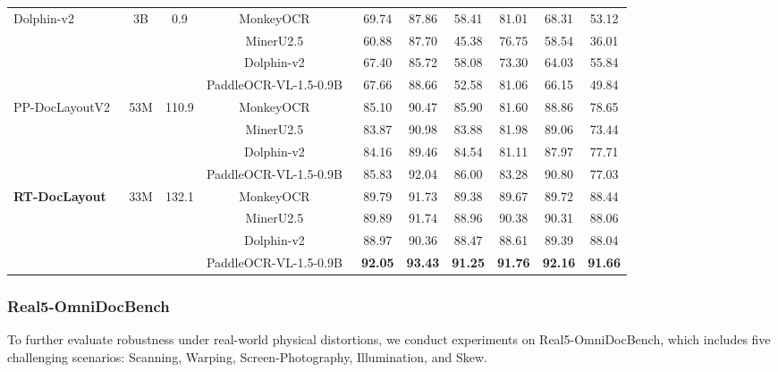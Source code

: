 \documentclass[11pt, a4paper,logo,  copyright, nonumbering]{paddleocr}
\begin{document}
\begin{table}[t]
{\begin{tabular}{l|c|c|c|c|c c c c c}
\midrule
\multirow{4}{*}{Dolphin-v2~\cite{feng2026dolphinv2universaldocumentparsing}}
& \multirow{4}{*}{3B}
& \multirow{4}{*}{0.9}
& MonkeyOCR~\cite{li2026monkeyocrdocumentparsingstructurerecognitionrelation} & 69.74 & 87.86 & 58.41 & 81.01 & 68.31 & 53.12 \\
& & & MinerU2.5~\cite{niu2025mineru25decoupledvisionlanguagemodel} & 60.88 & 87.70 & 45.38 & 76.75 & 58.54 & 36.01 \\
& & & Dolphin-v2~\cite{feng2026dolphinv2universaldocumentparsing} & 67.40 & 85.72 & 58.08 & 73.30 & 64.03 & 55.84 \\
& & & PaddleOCR-VL-1.5-0.9B~\cite{cui2026paddleocrvl15multitask09bvlm} & 67.66 & 88.66 & 52.58 & 81.06 & 66.15 & 49.84 \\
\midrule
\multirow{4}{*}{PP-DocLayoutV2~\cite{cui2025paddleocrvlboostingmultilingualdocument}}
& \multirow{4}{*}{53M}
& \multirow{4}{*}{110.9}
& MonkeyOCR~\cite{li2026monkeyocrdocumentparsingstructurerecognitionrelation} & 85.10 & 90.47 & 85.90 & 81.60 & 88.86 & 78.65 \\
& & & MinerU2.5~\cite{niu2025mineru25decoupledvisionlanguagemodel} & 83.87 & 90.98 & 83.88 & 81.98 & 89.06 & 73.44 \\
& & & Dolphin-v2~\cite{feng2026dolphinv2universaldocumentparsing} & 84.16 & 89.46 & 84.54 & 81.11 & 87.97 & 77.71 \\
& & & PaddleOCR-VL-1.5-0.9B~\cite{cui2026paddleocrvl15multitask09bvlm} & 85.83 & 92.04 & 86.00 & 83.28 & 90.80 & 77.03 \\
\midrule
\multirow{4}{*}{\textbf{RT-DocLayout}}
& \multirow{4}{*}{33M}
& \multirow{4}{*}{132.1}
& MonkeyOCR~\cite{li2026monkeyocrdocumentparsingstructurerecognitionrelation} & 89.79 & 91.73 & 89.38 & 89.67 & 89.72 & 88.44 \\
& & & MinerU2.5~\cite{niu2025mineru25decoupledvisionlanguagemodel} & 89.89 & 91.74 & 88.96 & 90.38 & 90.31 & 88.06 \\
& & & Dolphin-v2~\cite{feng2026dolphinv2universaldocumentparsing} & 88.97 & 90.36 & 88.47 & 88.61 & 89.39 & 88.04 \\
& & & PaddleOCR-VL-1.5-0.9B~\cite{cui2026paddleocrvl15multitask09bvlm} &\textbf{ 92.05} & \textbf{93.43} &\textbf{ 91.25} & \textbf{91.76} & \textbf{92.16} & \textbf{91.66} \\
\bottomrule
\end{tabular}
}
\label{tab:layout_recognition_combo_v2}
\end{table}


\subsubsection{Real5-OmniDocBench}
To further evaluate robustness under real-world physical distortions, we conduct experiments on Real5-OmniDocBench, which includes five challenging scenarios: Scanning, Warping, Screen-Photography, Illumination, and Skew.
\end{document}
